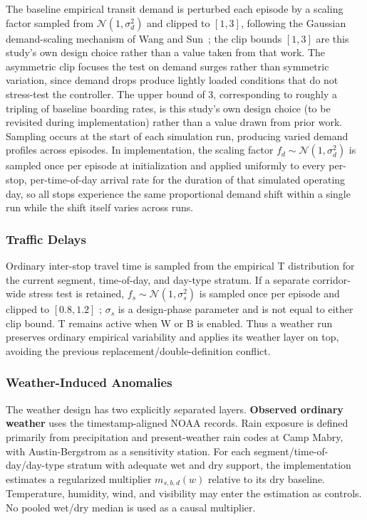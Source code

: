 The baseline empirical transit demand is perturbed each episode by a scaling factor sampled from $\mathcal{N}(1, \sigma_d^2)$ and clipped to $[1, 3]$, following the Gaussian demand-scaling mechanism of Wang and Sun~\cite{Wangsun}; the clip bounds $[1,3]$ are this study's own design choice rather than a value taken from that work. The asymmetric clip focuses the test on demand surges rather than symmetric variation, since demand drops produce lightly loaded conditions that do not stress-test the controller. The upper bound of 3, corresponding to roughly a tripling of baseline boarding rates, is this study's own design choice (to be revisited during implementation) rather than a value drawn from prior work. Sampling occurs at the start of each simulation run, producing varied demand profiles across episodes. In implementation, the scaling factor $f_d \sim \mathcal{N}(1, \sigma_d^2)$ is sampled once per episode at initialization and applied uniformly to every per-stop, per-time-of-day arrival rate for the duration of that simulated operating day, so all stops experience the same proportional demand shift within a single run while the shift itself varies across runs.

\subsubsection{Traffic Delays}

Ordinary inter-stop travel time is sampled from the empirical T distribution for the current segment, time-of-day, and day-type stratum. If a separate corridor-wide stress test is retained, $f_s \sim \mathcal{N}(1,\sigma_s^2)$ is sampled once per episode and clipped to $[0.8,1.2]$ \cite{Wangsun}; $\sigma_s$ is a design-phase parameter and is not equal to either clip bound. T remains active when W or B is enabled. Thus a weather run preserves ordinary empirical variability and applies its weather layer on top, avoiding the previous replacement/double-definition conflict.

\subsubsection{Weather-Induced Anomalies}

The weather design has two explicitly separated layers. \textbf{Observed ordinary weather} uses the timestamp-aligned NOAA records. Rain exposure is defined primarily from precipitation and present-weather rain codes at Camp Mabry, with Austin-Bergstrom as a sensitivity station. For each segment/time-of-day/day-type stratum with adequate wet and dry support, the implementation estimates a regularized multiplier $m_{s,b,d}(w)$ relative to its dry baseline. Temperature, humidity, wind, and visibility may enter the estimation as controls. No pooled wet/dry median is used as a causal multiplier.

